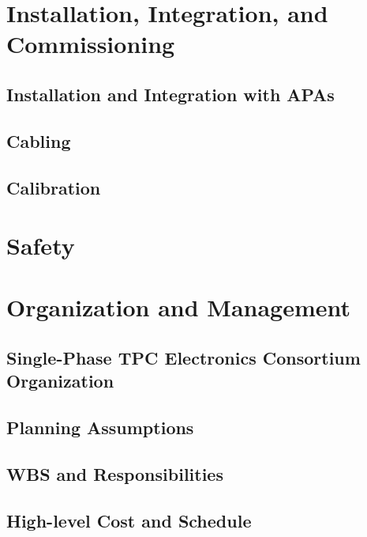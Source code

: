 \section{Installation, Integration, and Commissioning}
\label{sec:fdsp-tpc-elec-install}

\subsection{Installation and Integration with APAs}
\label{sec:fdsp-tpc-elec-install-apa}

\subsection{Cabling}
\label{sec:fdsp-tpc-elec-install-cabling}

\subsection{Calibration}
\label{sec:fdsp-tpc-elec-install-calib}



\section{Safety}
\label{sec:fdsp-tpc-elec-safety}



\section{Organization and Management}
\label{sec:fdsp-tpc-elec-org}

\subsection{Single-Phase TPC Electronics Consortium Organization}
\label{sec:fdsp-tpc-elec-org-consortium}

\subsection{Planning Assumptions}
\label{sec:fdsp-tpc-elec-org-assmp}

\subsection{WBS and Responsibilities}
\label{sec:fdsp-tpc-elec-org-wbs}

\subsection{High-level Cost and Schedule}
\label{sec:fdsp-tpc-elec-org-cs}
